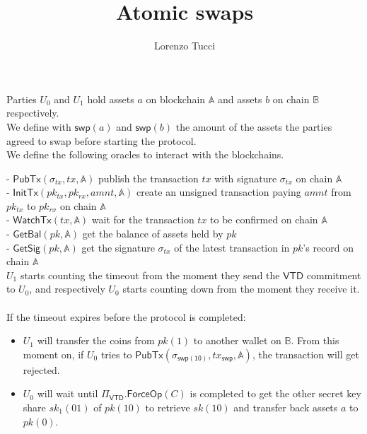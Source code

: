 \documentclass{article}      	%
\begin{document}
         
\author{Lorenzo Tucci}
\title{Atomic swaps}

\maketitle

Parties $U_0$ and $U_1$ hold assets $a$ on blockchain $\mathbb{A}$ and assets $b$ on chain $\mathbb{B}$ respectively. \\
We define with $\mathsf{swp}(a)$ and $\mathsf{swp}(b)$ the amount of the assets the parties agreed to swap before starting the protocol. \\

We define the following oracles to interact with the blockchains.

- $\mathsf{PubTx}(\sigma_{tx}, tx, \mathbb{A})$ publish the transaction $tx$ with signature $\sigma_{tx}$ on chain $\mathbb{A}$ \\
- $\mathsf{InitTx}(pk_{tx}, pk_{rx}, amnt, \mathbb{A})$ create an unsigned transaction paying $amnt$ from $pk_{tx}$ to $pk_{rx}$ on chain $\mathbb{A}$ \\
- $\mathsf{WatchTx}(tx, \mathbb{A})$ wait for the transaction $tx$ to be confirmed on chain $\mathbb{A}$ \\
- $\mathsf{GetBal}(pk, \mathbb{A})$ get the balance of assets held by $pk$ \\
- $\mathsf{GetSig}(pk, \mathbb{A})$ get the signature $\sigma_{tx}$ of the latest transaction in $pk$'s record on chain $\mathbb{A}$ \\

$U_1$ starts counting the timeout from the moment they send the $\mathsf{VTD}$ commitment to $U_0$, and respectively $U_0$ starts counting down from the moment they receive it. \\
\\
If the timeout expires before the protocol is completed: 
\begin{itemize}
    \item $U_1$ will transfer the coins from $pk(1)$ to another wallet on $\mathbb{B}$. From this moment on, if $U_0$ tries to $\mathsf{PubTx}(\sigma_{\mathsf{swp(10)}}, tx_\mathsf{swp}, \mathbb{A})$, the transaction will get rejected. \\
    \item $U_0$ will wait until $\Pi_{\mathsf{VTD}}.\mathsf{ForceOp}(C)$ is completed to get the other secret key share $sk_1(01)$ of $pk(10)$ to retrieve $sk(10)$ and transfer back assets $a$ to $pk(0)$.
\end{itemize}
\end{document}
